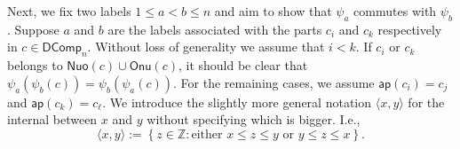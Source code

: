 \documentclass[reqno]{amsart}
\numberwithin{equation}{section}
\theoremstyle{definition}
\theoremstyle{named}
\newcommand{\set}[1]{\left\{#1\right\}}
\newcommand{\bZ}{\mathbb{Z}}
\def\DComp{\mathsf{DComp}}
\def\Nuo{\mathsf{Nuo}}
\def\Onu{\mathsf{Onu}}
\def\ap{\mathsf{ap}}
\begin{document}
Next, we fix two labels $1\le a<b\le n$ and aim to show that $\psi_a$ commutes with $\psi_b$. Suppose $a$ and $b$ are the labels associated with the parts $c_i$ and $c_k$ respectively in $c\in\DComp_n$. Without loss of generality we assume that $i<k$. If $c_i$ or $c_k$ belongs to $\Nuo(c)\cup\Onu(c)$, it should be clear that $\psi_a(\psi_b(c))=\psi_b(\psi_a(c))$. For the remaining cases, we assume $\ap(c_i)=c_j$ and $\ap(c_k)=c_{\ell}$. We introduce the slightly more general notation $\langle x,y\rangle$ for the internal between $x$ and $y$ without specifying which is bigger. I.e., 
$$\langle x,y\rangle:=\set{z\in\bZ:\text{either $x\le z\le y$ or $y\le z\le x$}}.$$ 
\end{document}
